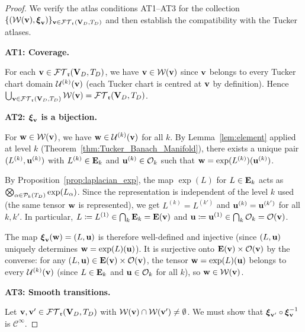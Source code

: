 \begin{proof}
We verify the atlas conditions AT1--AT3 for the collection
$\{(\mathcal{W}(\mathbf{v}), \boldsymbol{\xi}_{\mathbf{v}})\}_{\mathbf{v} \in \mathcal{FT}_{\mathfrak{r}}(\mathbf{V}_D,T_D)}$
and then establish the compatibility with the Tucker atlases.

\medskip
\noindent\textbf{AT1: Coverage.}

For each $\mathbf{v} \in \mathcal{FT}_{\mathfrak{r}}(\mathbf{V}_D,T_D)$, we have $\mathbf{v} \in \mathcal{W}(\mathbf{v})$ since
$\mathbf{v}$ belongs to every Tucker chart domain $\mathcal{U}^{(k)}(\mathbf{v})$
(each Tucker chart is centred at $\mathbf{v}$ by definition).
Hence $\bigcup_{\mathbf{v} \in \mathcal{FT}_{\mathfrak{r}}(\mathbf{V}_D,T_D)} \mathcal{W}(\mathbf{v}) = \mathcal{FT}_{\mathfrak{r}}(\mathbf{V}_D,T_D)$.

\medskip
\noindent\textbf{AT2: $\boldsymbol{\xi}_{\mathbf{v}}$ is a bijection.}

For $\mathbf{w} \in \mathcal{W}(\mathbf{v})$, we have $\mathbf{w} \in \mathcal{U}^{(k)}(\mathbf{v})$
for all $k$. By Lemma~\ref{lem:element} applied at level $k$
(Theorem~\ref{thm:Tucker_Banach_Manifold}), there exists a unique
pair $(L^{(k)}, \mathbf{u}^{(k)})$ with $L^{(k)} \in \mathbf{E}_{k}$ and
$\mathbf{u}^{(k)} \in \mathcal{O}_k$ such that $\mathbf{w} = \exp(L^{(k)})(\mathbf{u}^{(k)})$.

By Proposition~\ref{prop:laplacian_exp}, the map $\exp(L)$ for
$L \in \mathbf{E}_{k}$ acts as $\bigotimes_{\alpha \in \mathcal{P}_{k}(T_D)}
\exp(L_\alpha)$. Since the representation is independent of the
level $k$ used (the same tensor $\mathbf{w}$ is represented), we get
$L^{(k)} = L^{(k')}$ and $\mathbf{u}^{(k)} = \mathbf{u}^{(k')}$ for all $k, k'$.
In particular, $L \coloneqq L^{(1)} \in \bigcap_k \mathbf{E}_{k}
= \mathbf{E}(\mathbf{v})$ and $\mathbf{u} \coloneqq \mathbf{u}^{(1)} \in
\bigcap_k \mathcal{O}_k = \mathcal{O}(\mathbf{v})$.

The map $\boldsymbol{\xi}_{\mathbf{v}}(\mathbf{w}) = (L, \mathbf{u})$ is therefore
well-defined and injective (since $(L, \mathbf{u})$ uniquely determines
$\mathbf{w} = \exp(L)(\mathbf{u})$). It is surjective onto $\mathbf{E}(\mathbf{v})
\times \mathcal{O}(\mathbf{v})$ by the converse: for any
$(L, \mathbf{u}) \in \mathbf{E}(\mathbf{v}) \times \mathcal{O}(\mathbf{v})$, the tensor
$\mathbf{w} = \exp(L)(\mathbf{u})$ belongs to every $\mathcal{U}^{(k)}(\mathbf{v})$ (since
$L \in \mathbf{E}_{k}$ and $\mathbf{u} \in \mathcal{O}_k$ for all $k$), so
$\mathbf{w} \in \mathcal{W}(\mathbf{v})$.

\medskip
\noindent\textbf{AT3: Smooth transitions.}

Let $\mathbf{v}, \mathbf{v}' \in \mathcal{FT}_{\mathfrak{r}}(\mathbf{V}_D,T_D)$ with $\mathcal{W}(\mathbf{v}) \cap \mathcal{W}(\mathbf{v}')
\neq \emptyset$. We must show that
$\boldsymbol{\xi}_{\mathbf{v}'} \circ \boldsymbol{\xi}_{\mathbf{v}}^{-1}$ is
$\mathcal{C}^\infty$.


\end{proof}

